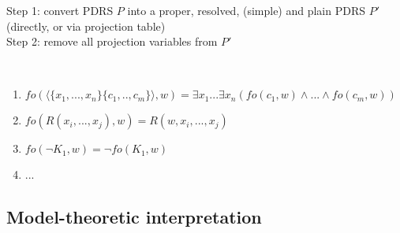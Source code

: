 Step 1: convert PDRS $P$ into a proper, resolved, (simple) and plain PDRS $P'$
(directly, or via projection table)\\

\noindent Step 2: remove all projection variables from $P'$


\begin{definition}~
  \begin{enumerate}
    \item $fo(\langle\{x_1,...,x_n\}\{c_1,..,c_m\}\rangle,w) 
      = \exists x_1...\exists x_n(fo(c_1,w)\wedge...\wedge fo(c_m,w))$
    \item $fo(R(x_i,...,x_j),w) = R(w,x_i,...,x_j)$
    \item $fo(\neg K_1,w) = \neg fo(K_1,w)$
    \item ...
  \end{enumerate}
\end{definition}


\subsection{Model-theoretic interpretation}
